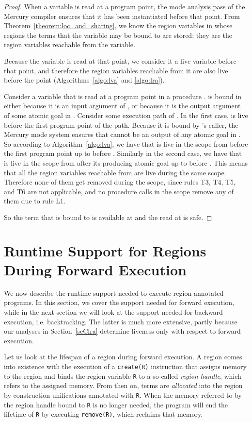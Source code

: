 \documentclass{tlp}
\newcommand{\code}[1]{{\tt#1}}
\begin{document}
\begin{proof}
When a variable is read at a program point,
the mode analysis pass of the Mercury compiler ensures
that it has been instantiated before that point.
From Theorem~\ref{theorem:loc_and_sharing},
we know the region variables in whose regions
the terms that the variable may be bound to are stored;
they are the region variables reachable from the variable.

Because the variable is read at that point,
we consider it a live variable before that point,
and therefore the region variables reachable from it
are also live before the point
(Algorithms~\ref{algo:lva} and \ref{algo:lra}).

Consider a variable  that is read at a program point  in a procedure .
 is bound in 
either because it is an input argument of ,
or because it is the output argument of some atomic goal in .
Consider some execution path of .
In the first case,  is live before the first program point of the path.
Because it is bound by 's caller, the Mercury mode system ensures that
 cannot be an output of any atomic goal in .
So according to Algorithm~\ref{algo:lva}, we have that
 is live in the scope from before the first program point up to before .
Similarly in the second case, we have that
 is live in the scope from after its producing atomic goal up to before .
This means that all the region variables reachable from 
are live during the same scope.
Therefore none of them get removed during the scope,
since rules T3, T4, T5, and T6 are not applicable,
and no procedure calls in the scope remove any of them due to rule L1.

So the term that  is bound to is available at 
and the read at  is safe.
\end{proof}

\section{Runtime Support for Regions During Forward Execution}
\label{seCsupportdet}

We now describe the runtime support needed
to execute region-annotated programs.
In this section,
we cover the support needed for forward execution,
while in the next section we will look at
the support needed for backward execution, i.e. backtracking.
The latter is much more extensive,
partly because our analyses in Section~\ref{seClra}
determine liveness only with respect to forward execution.

Let us look at the lifespan of a region during forward execution.
A region comes into existence
with the execution of a \code{create(R)} instruction
that assigns memory to the region and
binds the region variable \code{R} to a so-called {\em region handle},
which refers to the assigned memory.
From then on, terms are \emph{allocated} into the region
by construction unifications annotated with \code{R}.
When the memory referred to by the region handle bound to \code{R}
is no longer needed,
the program will end the lifetime of \code{R}
by executing \code{remove(R)}, which reclaims that memory.
\end{document}
